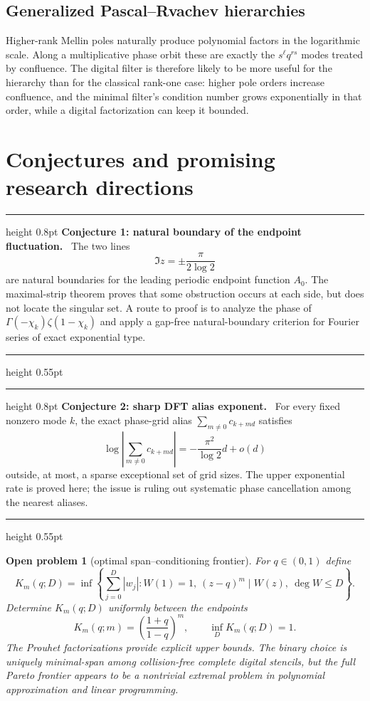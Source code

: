 \documentclass[11pt,oneside]{article}
\numberwithin{equation}{section}
\newtheorem{problem}[theorem]{Open problem}
\theoremstyle{definition}
\theoremstyle{remark}
\newenvironment{conjecturebox}[1]{%
  \par\medskip\noindent\begin{center}\begin{minipage}{0.94\textwidth}%
  \color{Gold}\hrule height 0.8pt\vspace{0.6em}%
  \color{black}\textbf{\color{Gold}#1.}\ }{%
  \par\vspace{0.6em}\color{Gold}\hrule height 0.55pt
  \end{minipage}\end{center}\medskip}
\begin{document}
\subsection{Generalized Pascal--Rvachev hierarchies}

Higher-rank Mellin poles naturally produce polynomial factors in the logarithmic scale.
Along a multiplicative phase orbit these are exactly the $s^\ell q^{rs}$ modes treated by
confluence.  The digital filter is therefore likely to be more useful for the hierarchy
than for the classical rank-one case: higher pole orders increase confluence, and the
minimal filter's condition number grows exponentially in that order, while a digital
factorization can keep it bounded.

\section{Conjectures and promising research directions}
\label{sec:open}

\begin{conjecturebox}{Conjecture 1: natural boundary of the endpoint fluctuation}
The two lines
\[
 \Im z=\pm\frac{\pi}{2\log2}
\]
are natural boundaries for the leading periodic endpoint function $A_0$.  The maximal-strip
theorem proves that some obstruction occurs at each side, but does not locate the singular
set.  A route to proof is to analyze the phase of
$\Gamma(-\chi_k)\zeta(1-\chi_k)$ and apply a gap-free natural-boundary criterion for Fourier
series of exact exponential type.
\end{conjecturebox}

\begin{conjecturebox}{Conjecture 2: sharp DFT alias exponent}
For every fixed nonzero mode $k$, the exact phase-grid alias
$\sum_{m\ne0}c_{k+md}$ satisfies
\[
 \log\left|\sum_{m\ne0}c_{k+md}\right|
 =-\frac{\pi^2}{\log2}d+o(d)
\]
outside, at most, a sparse exceptional set of grid sizes.  The upper exponential rate is
proved here; the issue is ruling out systematic phase cancellation among the nearest aliases.
\end{conjecturebox}

\begin{problem}[optimal span--conditioning frontier]
For $q\in(0,1)$ define
\[
 K_m(q;D)=\inf\left\{\sum_{j=0}^{D}|w_j|:
 W(1)=1,\ (z-q)^m\mid W(z),\ \deg W\le D\right\}.
\]
Determine $K_m(q;D)$ uniformly between the endpoints
\[
 K_m(q;m)=\left(\frac{1+q}{1-q}\right)^m,
 \qquad
 \inf_DK_m(q;D)=1.
\]
The Prouhet factorizations provide explicit upper bounds.  The binary choice is uniquely
minimal-span among collision-free complete digital stencils, but the full Pareto frontier
appears to be a nontrivial extremal problem in polynomial approximation and linear
programming.
\end{problem}
\end{document}
